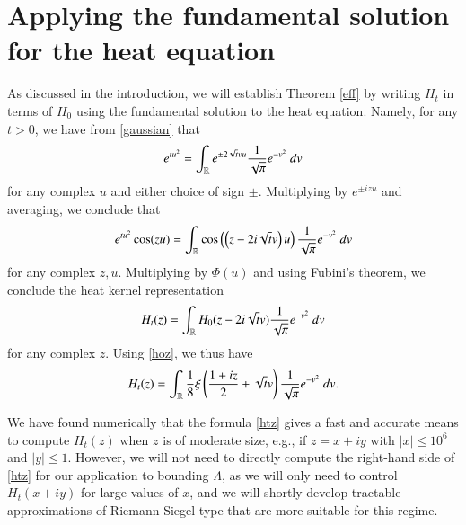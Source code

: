 \section{Applying the fundamental solution for the heat equation}\label{heatflow-sec}

As discussed in the introduction, we will establish Theorem \ref{eff} by writing $H_t$ in terms of $H_0$ using the fundamental solution to the heat equation.  Namely, for any $t>0$, we have from \eqref{gaussian} that
$$
e^{tu^2} = \int_{\mathbb{R}} e^{\pm 2 \sqrt{t} vu} \frac{1}{\sqrt{\pi}} e^{-v^2}\ dv$$
for any complex $u$ and either choice of sign $\pm$. Multiplying by $e^{\pm i zu}$ and averaging, we conclude that
$$
e^{tu^2} \cos(zu) = \int_{\mathbb{R}} \cos\left(\left(z - 2 i \sqrt{t} v\right)u\right) \frac{1}{\sqrt{\pi}} e^{-v^2}\ dv$$
for any complex $z,u$.  Multiplying by $\Phi(u)$ and using Fubini's theorem, we conclude the heat kernel representation
$$ H_t(z) = \int_{\mathbb{R}} H_0( z - 2i \sqrt{t} v ) \frac{1}{\sqrt{\pi}} e^{-v^2}\ dv $$
for any complex $z$.  Using \eqref{hoz}, we thus have
\begin{equation}\label{htz}
 H_t(z) = \int_{\mathbb{R}} \frac{1}{8} \xi\left( \frac{1+iz}{2} + \sqrt{t} v \right) \frac{1}{\sqrt{\pi}} e^{-v^2}\ dv.
\end{equation}

\begin{remark}  We have found numerically that the formula \eqref{htz} gives a fast and accurate means to compute $H_t(z)$ when $z$ is of moderate size, e.g., if $z = x+iy$ with $|x| \leq 10^6$ and $|y| \leq 1$.  However, we will not need to directly compute the right-hand side of \eqref{htz} for our application to bounding $\Lambda$, as we will only need to control $H_t(x+iy)$ for large values of $x$, and we will shortly develop tractable approximations of Riemann-Siegel type that are more suitable for this regime.
\end{remark}

